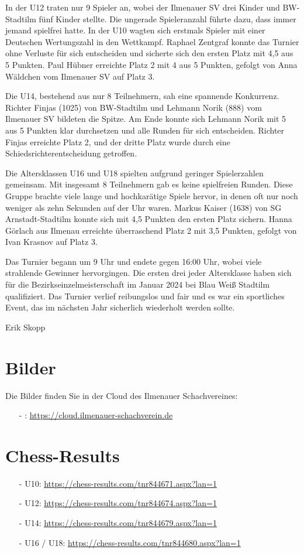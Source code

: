 \documentclass[a4paper,ngerman]{tui-algo-seminar}
\begin{document}
In der U12 traten nur 9 Spieler an, wobei der Ilmenauer SV drei Kinder und BW-Stadtilm fünf Kinder stellte. Die ungerade Spieleranzahl führte dazu, dass immer jemand spielfrei hatte. In der U10 wagten sich erstmals Spieler mit einer Deutschen Wertungszahl in den Wettkampf. Raphael Zentgraf konnte das Turnier ohne Verluste für sich entscheiden und sicherte sich den ersten Platz mit 4,5 aus 5 Punkten. Paul Hübner erreichte Platz 2 mit 4 aus 5 Punkten, gefolgt von Anna Wäldchen vom Ilmenauer SV auf Platz 3.

Die U14, bestehend aus nur 8 Teilnehmern, sah eine spannende Konkurrenz. Richter Finjas (1025) von BW-Stadtilm und Lehmann Norik (888) vom Ilmenauer SV bildeten die Spitze. Am Ende konnte sich Lehmann Norik mit 5 aus 5 Punkten klar durchsetzen und alle Runden für sich entscheiden. Richter Finjas erreichte Platz 2, und der dritte Platz wurde durch eine Schiedsrichterentscheidung getroffen.

Die Altersklassen U16 und U18 spielten aufgrund geringer Spielerzahlen gemeinsam. Mit insgesamt 8 Teilnehmern gab es keine spielfreien Runden. Diese Gruppe brachte viele lange und hochkarätige Spiele hervor, in denen oft nur noch weniger als zehn Sekunden auf der Uhr waren. Markus Kaiser (1638) von SG Arnstadt-Stadtilm konnte sich mit 4,5 Punkten den ersten Platz sichern. Hanna Görlach aus Ilmenau erreichte überraschend Platz 2 mit 3,5 Punkten, gefolgt von Ivan Krasnov auf Platz 3.

Das Turnier begann um 9 Uhr und endete gegen 16:00 Uhr, wobei viele strahlende Gewinner hervorgingen. Die ersten drei jeder Altersklasse haben sich für die Bezirkseinzelmeisterschaft im Januar 2024 bei Blau Weiß Stadtilm qualifiziert. Das Turnier verlief reibungslos und fair und es war ein sportliches Event, das im nächsten Jahr sicherlich wiederholt werden sollte.


Erik Skopp



\section{Bilder}
Die Bilder finden Sie in der Cloud des Ilmenauer Schachvereines: 
\begin{itemize}
	\item[-]: \url{https://cloud.ilmenauer-schachverein.de}
\end{itemize}

\section{Chess-Results}
\begin{itemize}
	\item[-] U10: \url{https://chess-results.com/tnr844671.aspx?lan=1}
	\item[-] U12: \url{https://chess-results.com/tnr844674.aspx?lan=1}
	\item[-] U14: \url{https://chess-results.com/tnr844679.aspx?lan=1}
	\item[-] U16 / U18: \url{https://chess-results.com/tnr844680.aspx?lan=1}
\end{itemize}
\clearpage
\end{document}
